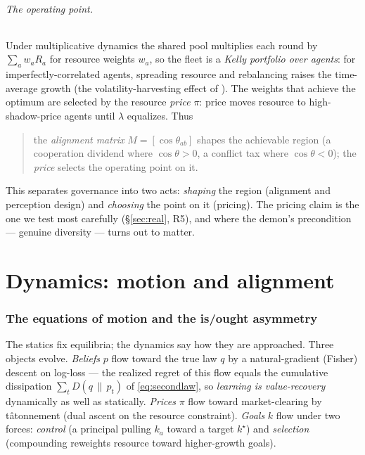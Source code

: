 \documentclass[11pt]{article}
\theoremstyle{plain}
\theoremstyle{definition}
\theoremstyle{remark}
\newcommand{\KL}[2]{D\!\left(#1\,\|\,#2\right)}
\begin{document}
\paragraph{The operating point.} Under multiplicative dynamics the shared pool multiplies each round by
$\sum_a w_a R_a$ for resource weights $w_a$, so the fleet is a \emph{Kelly portfolio over agents}: for
imperfectly-correlated agents, spreading resource and rebalancing raises the time-average growth (the
volatility-harvesting effect of \citealp{kelly1956,cover1991}). The weights that achieve the optimum are
selected by the resource \emph{price} $\pi$: price moves resource to high-shadow-price agents until $\lambda$
equalizes. Thus
\begin{quote}
the \emph{alignment matrix} $M=[\cos\theta_{ab}]$ shapes the achievable region (a cooperation dividend where
$\cos\theta>0$, a conflict tax where $\cos\theta<0$); the \emph{price} selects the operating point on it.
\end{quote}
This separates governance into two acts: \emph{shaping} the region (alignment and perception design) and
\emph{choosing} the point on it (pricing). The pricing claim is the one we test most carefully
(\S\ref{sec:real}, R5), and where the demon's precondition --- genuine diversity --- turns out to matter.

\part{Dynamics: motion and alignment}\label{part:dynamics}

\section{The equations of motion and the is/ought asymmetry}\label{sec:dynamics}

The statics fix equilibria; the dynamics say how they are approached. Three objects evolve. \emph{Beliefs} $p$
flow toward the true law $q$ by a natural-gradient (Fisher) descent on log-loss --- the realized regret of this
flow equals the cumulative dissipation $\sum_t \KL{q}{p_t}$ of \eqref{eq:secondlaw}, so \emph{learning is
value-recovery} dynamically as well as statically. \emph{Prices} $\pi$ flow toward market-clearing by
t\^atonnement (dual ascent on the resource constraint). \emph{Goals} $k$ flow under two forces: \emph{control}
(a principal pulling $k_a$ toward a target $k^\star$) and \emph{selection} (compounding reweights resource
toward higher-growth goals).
\end{document}
